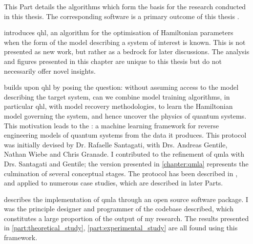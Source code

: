 This Part details the algorithms which form the basis for the research conducted in this thesis. 
The corresponding software is a primary outcome of this thesis \cite{flynn2021QMLA, qmla_docs}.

\par 
\vspace{1cm}

 introduces \gls{qhl}, an algorithm for the optimisation of Hamiltonian parameters
    when the form of the model describing a system of interest is known. 
    This is not presented as new work, but rather as a bedrock for later discussions. 
    The analysis and figures presented in this chapter are unique to this thesis but do not necessarily offer novel insights. 
\par 
\vspace{1cm}
 builds upon \gls{qhl} by posing the question: 
    without assuming access to the model describing the target system, can we combine model training algorithms, 
    in particular \gls{qhl}, with model recovery methodologies, to learn the Hamiltonian model 
    governing the system, and hence uncover the physics of quantum systems. 
    This motivation leads to the : 
    a machine learning framework for reverse engineering models of quantum systems from the data it produces. 
    This protocol was initially devised by Dr. Rafaelle Santagati, with Drs. Andreas Gentile, Nathan Wiebe and Chris Granade. 
    I contributed to the refinement of \gls{qmla} with Drs. Santagati and Gentile; 
    the version presented in \cref{chapter:qmla} represents the culmination of several conceptual stages. 
    The protocol has been described in \cite{gentile2020learning}, 
    and applied to numerous case studies, which are described in later Parts. 
\par
\vspace{1cm}

 describes the implementation of \gls{qmla} through an open source software package. 
I was the principle designer and programmer of the codebase described, which constitutes a large proportion of the output of my research. 
The results presented in \cref{part:theoretical_study}, \cref{part:experimental_study} are all found using this framework. 

